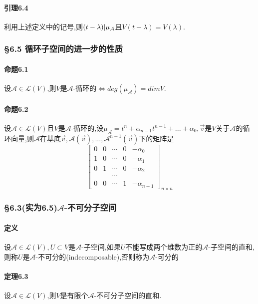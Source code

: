\documentclass{ctexart}
\begin{document}
\paragraph{引理6.4}
利用上述定义中的记号,则$(t-\lambda) \arrowvert \mu_{\mathcal{A}}$且$V(t-\lambda) = V(\lambda)$.

\subsubsection{§6.5 循环子空间的进一步的性质}

\paragraph{命题6.1}
设$\mathcal{A} \in \mathcal{L}(V)$,则$V$是$\mathcal{A}$-循环的$\Leftrightarrow deg(\mu_\mathcal{A}) = dimV$.

\paragraph{命题6.2}
设$\mathcal{A} \in \mathcal{L}(V)$且$V$是$\mathcal{A}$-循环的,设$\mu_{\mathcal{A}} = t^{n}+\alpha_{n-1}t^{n-1}+...+\alpha_{0},\vec{v}$是$V$关于$\mathcal{A}$的循环向量,则$\mathcal{A}$在基底$\vec{v},\mathcal{A}(\vec{v}),...,\mathcal{A}^{n-1}(\vec{v})$下的矩阵是
$$
 \left[
 \begin{matrix}
  0 & 0 & \cdots & 0 & -\alpha_{0} \\
  1 & 0 & \cdots & 0 & -\alpha_{1} \\
  0 & 1 & \cdots & 0 & -\alpha_{2} \\
     &    & \cdots \\
  0 & 0 & \cdots & 1 & -\alpha_{n-1}
   
  \end{matrix}
  \right]_{n\times n}
$$
\subsubsection{§6.3(实为6.5)$\mathcal{A}$-不可分子空间}

\paragraph{定义}
设$\mathcal{A} \in \mathcal{L}(V),U \subset V$是$\mathcal{A}$-子空间,如果$U$不能写成两个维数为正的$\mathcal{A}$-子空间的直和,则称$U$是$\mathcal{A}$-不可分的(indecomposable),否则称为$\mathcal{A}$-可分的

\paragraph{定理6.3}
设$\mathcal{A} \in \mathcal{L}(V)$,则$V$是有限个$\mathcal{A}$-不可分子空间的直和.
\end{document}
